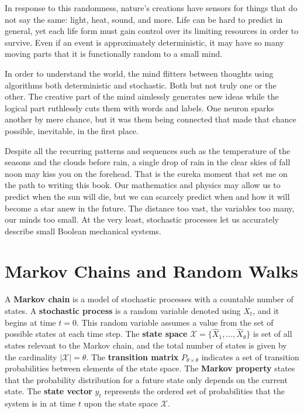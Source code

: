 \documentclass[10pt, a5paper, twoside, openright]{memoir}
\begin{document}
In response to this randomness, nature's creations have sensors for things that do not say the same: light, heat, sound, and more. Life can be hard to predict in general, yet each life form must gain control over its limiting resources in order to survive. Even if an event is approximately deterministic, it may have so many moving parts that it is functionally random to a small mind.

In order to understand the world, the mind flitters between thoughts using algorithms both deterministic and stochastic. Both but not truly one or the other. The creative part of the mind aimlessly generates new ideas while the logical part ruthlessly cuts them with words and labels. One neuron sparks another by mere chance, but it was them being connected that made that chance possible, inevitable, in the first place.

Despite all the recurring patterns and sequences such as the temperature of the seasons and the clouds before rain, a single drop of rain in the clear skies of fall noon may kiss you on the forehead. That is the eureka moment that set me on the path to writing this book. Our mathematics and physics may allow us to predict when the sun will die, but we can scarcely predict when and how it will become a star anew in the future. The distance too vast, the variables too many, our minds too small. At the very least, stochastic processes let us accurately describe small Boolean mechanical systems.

\section{Markov Chains and Random Walks}
A \textbf{Markov chain} is a model of stochastic processes with a countable number of states. A \textbf{stochastic process} is a random variable denoted using $X_t$, and it begins at time $t=0$. This random variable assumes a value from the set of possible states at each time step. The \textbf{state space} $\mathcal X = \{\hat X_1,...,\hat X_\theta\}$ is set of all states relevant to the Markov chain, and the total number of states is given by the cardinality $|\mathcal X| = \theta$. The \textbf{transition matrix} $P_{\theta \times \theta}$ indicates a set of transition probabilities between elements of the state space. The \textbf{Markov property} states that the probability distribution for a future state only depends on the current state. The \textbf{state vector} $y_t$ represents the ordered set of probabilities that the system is in at time $t$ upon the state space $\mathcal X$. 
\end{document}
